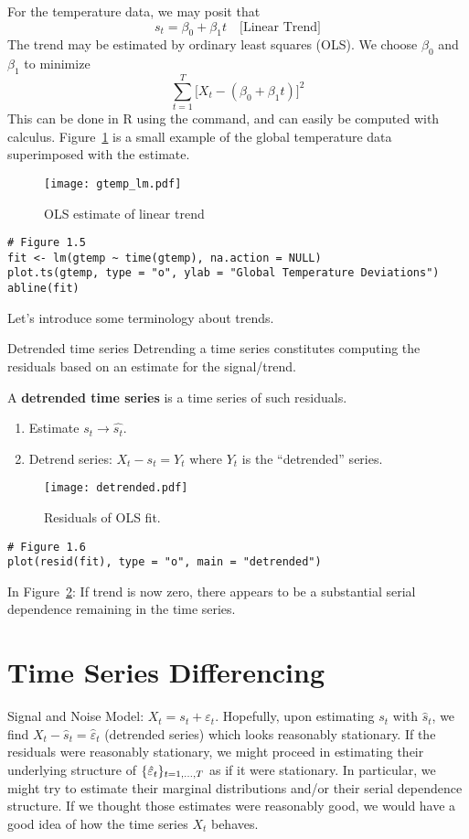 For the temperature data, we may posit that
\[ s_t=\beta_0+\beta_1 t\quad\text{[Linear Trend]} \]
The trend may be estimated by ordinary least squares (OLS).
We choose $ \beta_0 $ and $ \beta_1 $ to minimize
\[ \sum_{t=1}^{T} \bigl[X_t-(\beta_0+\beta_1 t)\bigr]^2 \]
This can be done in R using the  command, and
can easily be computed with calculus. Figure~\ref{fig:gtemp_lm}
is a small example of the global temperature data superimposed
with the  estimate.
\begin{figure}[!htbp]
    \centering
    \texttt{[image: gtemp\_lm.pdf]}
    \caption{OLS estimate of linear trend}\label{fig:gtemp_lm}
\end{figure}
\begin{verbatim}
# Figure 1.5
fit <- lm(gtemp ~ time(gtemp), na.action = NULL)
plot.ts(gtemp, type = "o", ylab = "Global Temperature Deviations")
abline(fit)
\end{verbatim}
Let's introduce some terminology about trends.
\begin{Definition}{Detrended time series}{}
    Detrending a time series constitutes computing the
    residuals based on an estimate for the signal/trend.

    A \textbf{detrended time series} is a time series of such residuals.
    \begin{enumerate}
        \item Estimate $ s_t\to \hat{s_t} $.
        \item Detrend series: $ X_t-\hat{s_t}=Y_t $
              where $ Y_t $ is the ``detrended'' series.
    \end{enumerate}
\end{Definition}
\begin{figure}[!htbp]
    \centering
    \texttt{[image: detrended.pdf]}
    \caption{Residuals of OLS fit.}\label{fig:detrended}
\end{figure}
\begin{verbatim}
# Figure 1.6
plot(resid(fit), type = "o", main = "detrended")
\end{verbatim}
In Figure~\ref{fig:detrended}:
If trend is now zero, there appears to be a substantial serial
dependence remaining in the time series.

\section{Time Series Differencing}
Signal and Noise Model: $ X_t=s_t+\varepsilon_t $. Hopefully,
upon estimating $ s_t $ with $ \hat{s}_t $,
we find $ X_t-\hat{s}_t=\hat{\varepsilon}_t $ (detrended series)
which looks reasonably stationary. If the residuals were
reasonably stationary, we might
proceed in estimating their underlying structure of $ \{\hat{\varepsilon}_t\}_{t=1,\ldots,T} $
as if it were stationary. {\color{blue}In particular, we might try to estimate their marginal
        distributions and/or their serial dependence structure. If we thought those estimates
        were reasonably good, we would have a good idea of how the time series $ X_t $ behaves.}

